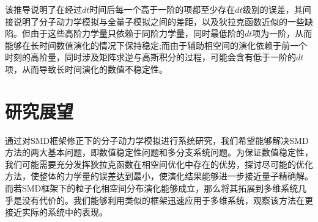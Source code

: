该推导说明了在经过$dt$时间后每一个高于一阶的项都至少存在$dt$级别的误差，其间接说明了分子动力学模拟与全量子模拟之间的差距，以及狄拉克函数近似的一些缺陷。但由于这些高阶力学量只依赖于同阶力学量，同时最低阶的$dt$项为一阶，从而能够在长时间数值演化的情况下保持稳定;而由于辅助相空间的演化依赖于前一个时刻的高阶量，同时涉及矩阵求逆与高斯积分的过程，可能会含有低于一阶的$dt$项，从而导致长时间演化的数值不稳定性。

\section{研究展望}
通过对SMD框架修正下的分子动力学模拟进行系统研究，我们希望能够解决SMD方法的两大基本问题，即数值稳定性问题和多分支系统问题。为保证数值稳定性，我们可能需要充分发挥狄拉克函数在相空间优化中存在的优势，探讨尽可能的优化方法，使整体的力学量的误差达到最小，使演化结果能够进一步接近量子精确解。而若SMD框架下的粒子化相空间分布演化能够成立，那么将其拓展到多维系统几乎是没有代价的。我们能够利用类似的框架迅速应用于多维系统，观察该方法在更接近实际的系统中的表现。
\newpage
{\songti\TimesNewRoman\printbibliography[title={参考文献}]}
